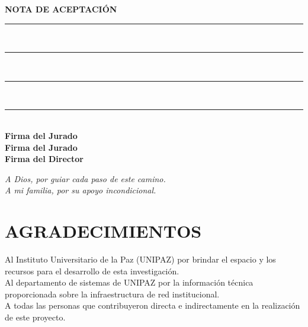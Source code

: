 \documentclass[12pt,letterpaper]{report}
\begin{document}
\newpage
\thispagestyle{empty}
\begin{center}
  \vspace*{3cm}
  \textbf{NOTA DE ACEPTACIÓN}\\[2cm]
  \rule{12cm}{0.5pt}\\[1cm]
  \rule{12cm}{0.5pt}\\[1cm]
  \rule{12cm}{0.5pt}\\[1cm]
  \rule{12cm}{0.5pt}\\[3cm]
  
  \textbf{Firma del Jurado}\\[2cm]
  \textbf{Firma del Jurado}\\[2cm]
  \textbf{Firma del Director}
\end{center}

\newpage
\thispagestyle{empty}
\vspace*{6cm}
\begin{flushright}
  \textit{A Dios, por guiar cada paso de este camino.\\
  A mi familia, por su apoyo incondicional.}
\end{flushright}

\newpage
\thispagestyle{empty}
\vspace*{3cm}
\section*{AGRADECIMIENTOS}
Al Instituto Universitario de la Paz (UNIPAZ) por brindar el espacio y los recursos para el desarrollo de esta investigación.\\
Al departamento de sistemas de UNIPAZ por la información técnica proporcionada sobre la infraestructura de red institucional.\\
A todas las personas que contribuyeron directa e indirectamente en la realización de este proyecto.

\newpage
\tableofcontents
\newpage
\listoffigures
\newpage
\listoftables
\end{document}
